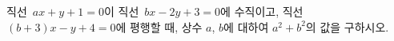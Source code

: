 직선~$ax+y+1=0$이 직선~$bx-2y+3=0$에 수직이고, 직선~$(b+3)x-y+4=0$에 평행할 때, 상수 $a$, $b$에 대하여 $a^2+b^2$의 값을 구하시오.
